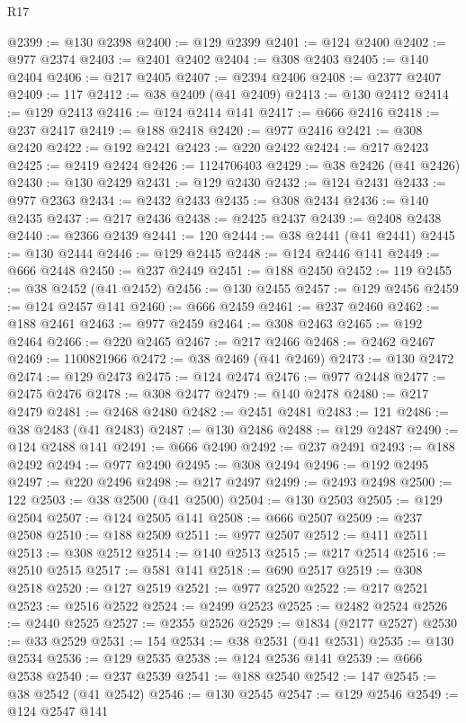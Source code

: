 \begin{lexlean}{R17}
\begin{coremodule}
@2399 := @130 @2398
@2400 := @129 @2399
@2401 := @124 @2400
@2402 := @977 @2374
@2403 := @2401 @2402
@2404 := @308 @2403
@2405 := @140 @2404
@2406 := @217 @2405
@2407 := @2394 @2406
@2408 := @2377 @2407
@2409 := 117
@2412 := @38 @2409 (@41 @2409)
@2413 := @130 @2412
@2414 := @129 @2413
@2416 := @124 @2414 @141
@2417 := @666 @2416
@2418 := @237 @2417
@2419 := @188 @2418
@2420 := @977 @2416
@2421 := @308 @2420
@2422 := @192 @2421
@2423 := @220 @2422
@2424 := @217 @2423
@2425 := @2419 @2424
@2426 := 1124706403
@2429 := @38 @2426 (@41 @2426)
@2430 := @130 @2429
@2431 := @129 @2430
@2432 := @124 @2431
@2433 := @977 @2363
@2434 := @2432 @2433
@2435 := @308 @2434
@2436 := @140 @2435
@2437 := @217 @2436
@2438 := @2425 @2437
@2439 := @2408 @2438
@2440 := @2366 @2439
@2441 := 120
@2444 := @38 @2441 (@41 @2441)
@2445 := @130 @2444
@2446 := @129 @2445
@2448 := @124 @2446 @141
@2449 := @666 @2448
@2450 := @237 @2449
@2451 := @188 @2450
@2452 := 119
@2455 := @38 @2452 (@41 @2452)
@2456 := @130 @2455
@2457 := @129 @2456
@2459 := @124 @2457 @141
@2460 := @666 @2459
@2461 := @237 @2460
@2462 := @188 @2461
@2463 := @977 @2459
@2464 := @308 @2463
@2465 := @192 @2464
@2466 := @220 @2465
@2467 := @217 @2466
@2468 := @2462 @2467
@2469 := 1100821966
@2472 := @38 @2469 (@41 @2469)
@2473 := @130 @2472
@2474 := @129 @2473
@2475 := @124 @2474
@2476 := @977 @2448
@2477 := @2475 @2476
@2478 := @308 @2477
@2479 := @140 @2478
@2480 := @217 @2479
@2481 := @2468 @2480
@2482 := @2451 @2481
@2483 := 121
@2486 := @38 @2483 (@41 @2483)
@2487 := @130 @2486
@2488 := @129 @2487
@2490 := @124 @2488 @141
@2491 := @666 @2490
@2492 := @237 @2491
@2493 := @188 @2492
@2494 := @977 @2490
@2495 := @308 @2494
@2496 := @192 @2495
@2497 := @220 @2496
@2498 := @217 @2497
@2499 := @2493 @2498
@2500 := 122
@2503 := @38 @2500 (@41 @2500)
@2504 := @130 @2503
@2505 := @129 @2504
@2507 := @124 @2505 @141
@2508 := @666 @2507
@2509 := @237 @2508
@2510 := @188 @2509
@2511 := @977 @2507
@2512 := @411 @2511
@2513 := @308 @2512
@2514 := @140 @2513
@2515 := @217 @2514
@2516 := @2510 @2515
@2517 := @581 @141
@2518 := @690 @2517
@2519 := @308 @2518
@2520 := @127 @2519
@2521 := @977 @2520
@2522 := @217 @2521
@2523 := @2516 @2522
@2524 := @2499 @2523
@2525 := @2482 @2524
@2526 := @2440 @2525
@2527 := @2355 @2526
@2529 := @1834 (@2177 @2527)
@2530 := @33 @2529
@2531 := 154
@2534 := @38 @2531 (@41 @2531)
@2535 := @130 @2534
@2536 := @129 @2535
@2538 := @124 @2536 @141
@2539 := @666 @2538
@2540 := @237 @2539
@2541 := @188 @2540
@2542 := 147
@2545 := @38 @2542 (@41 @2542)
@2546 := @130 @2545
@2547 := @129 @2546
@2549 := @124 @2547 @141

\end{coremodule}
\end{lexlean}
